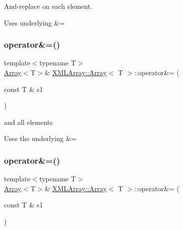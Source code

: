 And-\/replace on each element. 

Uses underlying \&= \mbox{\label{classXMLArray_1_1Array_a7f264e277398588e0e37763573f48fc7}} 
\subsubsection{\texorpdfstring{operator\&=()}{operator\&=()}\hspace{0.1cm}{\footnotesize\ttfamily [3/4]}}
{\footnotesize\ttfamily template$<$typename T$>$ \\
\mbox{\hyperlink{classXMLArray_1_1Array}{Array}}$<$T$>$\& \mbox{\hyperlink{classXMLArray_1_1Array}{X\+M\+L\+Array\+::\+Array}}$<$ T $>$\+::operator\&= (\begin{DoxyParamCaption}\item[{const T \&}]{s1 }\end{DoxyParamCaption})\hspace{0.3cm}{\ttfamily [inline]}}



and all elements 

Uses the underlying \&= \mbox{\label{classXMLArray_1_1Array_a7f264e277398588e0e37763573f48fc7}} 
\subsubsection{\texorpdfstring{operator\&=()}{operator\&=()}\hspace{0.1cm}{\footnotesize\ttfamily [4/4]}}
{\footnotesize\ttfamily template$<$typename T$>$ \\
\mbox{\hyperlink{classXMLArray_1_1Array}{Array}}$<$T$>$\& \mbox{\hyperlink{classXMLArray_1_1Array}{X\+M\+L\+Array\+::\+Array}}$<$ T $>$\+::operator\&= (\begin{DoxyParamCaption}\item[{const T \&}]{s1 }\end{DoxyParamCaption})\hspace{0.3cm}{\ttfamily [inline]}}



